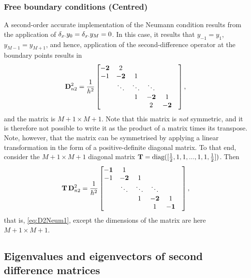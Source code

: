 \subsubsection{Free boundary conditions (Centred)}

A second-order accurate implementation of the Neumann condition results from the application of $\delta_{x\cdot} y_0=\delta_{x\cdot} y_M=0$. In this case, it results that $y_{-1}=y_1$, $y_{M-1}=y_{M+1}$, and hence, application of the second-difference operator at the boundary points results in
\begin{equation}\label{eq:D2Neum2}
{\bf D}^2_{n2} = \frac{1}{h^2}\begin{bmatrix}
{\bf -2}& 2&   &  &  &  \\ 
-1& {\bf -2} & 1 &  &  &\\
& \ddots & \ddots & \ddots &  &      \\
& &  1 & {\bf -2}& 1   \\
& &   & 2 & {\bf -2}   \\
\end{bmatrix},
\end{equation}
and the matrix is $M+1 \times M+1$. Note that this matrix is \emph{not} symmetric, and it is therefore not possible to write it as the product of a matrix times its transpose. Note, however, that the matrix can be symmetrised by applying a linear transformation in the form of a positive-definite diagonal matrix. To that end, consider the $M+1\times M+1$ diagonal matrix ${\bf T} = \text{diag}([\frac{1}{2},1,1,...,1,1,\frac{1}{2}])$. Then
\begin{equation}\label{eq:LinTransfn2}
{\bf T}\,{\bf D}^{2}_{n2} = \frac{1}{h^2}\begin{bmatrix}
{\bf -1}& 1&   &  &  &  \\ 
-1& {\bf -2} & 1 &  &  &\\
& \ddots & \ddots & \ddots &  &      \\
& &  1 & {\bf -2}& 1   \\
& &   & 1 & {\bf -1}   \\
\end{bmatrix},
\end{equation}
that is, \eqref{eq:D2Neum1}, except the dimensions of the matrix are here $M+1 \times M+1$.



\subsection{Eigenvalues and eigenvectors of second difference matrices}

